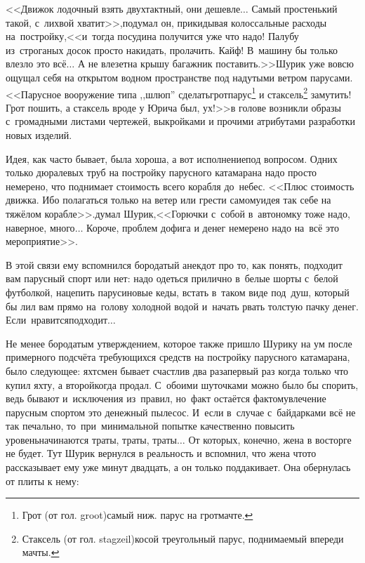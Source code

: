 {<<Движок лодочный взять двухтактный, они дешевле$\ldots$ Самый простенький такой, с~лихвой хватит>>,\mdash подумал он, прикидывая колоссальные расходы на~постройку,\mdash <<и~тогда посудина получится уже что надо! Палубу из~строганых досок просто накидать, пролачить. Кайф! В~машину бы только влезло это всё$\ldots$ А не влезет\mdash на крышу багажник поставить.>>\mdash Шурик уже вовсю ощущал себя на открытом водном пространстве под надутыми ветром парусами. <<Парусное вооружение типа ,,шлюп'' сделать\mdash грот\sdash парус\footnote{Грот (от гол. groot)\mdash самый ниж. парус на грот\sdash мачте.} и стаксель\footnote{Стаксель (от гол. stagzeil)\mdash косой треугольный парус, поднимаемый впереди мачты.} замутить! Грот пошить, а стаксель вроде у Юрича был, ух!>>\mdash в голове возникли образы с~громадными листами чертежей, выкройками и прочими атрибутами разработки новых изделий.

Идея, как часто бывает, была хороша, а вот исполнение\mdash под вопросом. Одних только дюралевых труб на постройку парусного катамарана надо просто немерено, что поднимает стоимость всего корабля до~небес. <<Плюс стоимость движка. Ибо полагаться только на ветер или грести самому\mdash идея так себе на тяжёлом корабле>>.\mdash думал Шурик,\mdash <<Горючки с~собой в~автономку тоже надо, наверное, много$\ldots$ Короче, проблем дофига и денег немерено надо на~всё это мероприятие>>. 

В этой связи ему вспомнился бородатый анекдот про то, как понять, подходит вам парусный спорт или нет: надо одеться прилично в~белые шорты с~белой футболкой, нацепить парусиновые кеды, встать в~таком виде под~душ, который бы лил вам прямо на~голову холодной водой и~начать рвать толстую пачку денег. Если~нравится\mdash подходит$\ldots$

Не менее бородатым утверждением, которое также пришло Шурику на ум после примерного подсчёта требующихся средств на постройку парусного катамарана, было следующее: яхтсмен бывает счастлив два раза\mdash первый раз когда только что купил яхту, а второй\mdash когда продал. С~обоими шуточками можно было бы спорить, ведь бывают и~исключения из~правил, но~факт остаётся фактом\mdash увлечение парусным спортом это денежный пылесос. И~если в~случае с~байдарками всё не так печально, то~при~минимальной попытке качественно повысить уровень\mdash начинаются траты, траты, траты$\ldots$ От которых, конечно, жена в восторге не будет. Тут Шурик вернулся в реальность и вспомнил, что жена что\sdash то рассказывает ему уже минут двадцать, а он только поддакивает. Она обернулась от плиты к нему:

}
